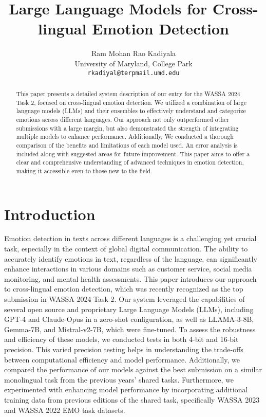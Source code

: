 \documentclass[11pt]{article}
\title{Large Language Models for Cross-lingual Emotion Detection}
\author{Ram Mohan Rao Kadiyala \\
  University of Maryland, College Park \\
  \texttt{rkadiyal@terpmail.umd.edu}}
\begin{document}
\maketitle
\begin{abstract}
This paper presents a detailed system description of our entry for the WASSA 2024 Task 2, focused on cross-lingual emotion detection. We utilized a combination of large language models (LLMs) and their ensembles to effectively understand and categorize emotions across different languages. Our approach not only outperformed other submissions with a large margin, but also demonstrated the strength of integrating multiple models to enhance performance. Additionally, We conducted a thorough comparison of the benefits and limitations of each model used. An error analysis is included along with suggested areas for future improvement. This paper aims to offer a clear and comprehensive understanding of advanced techniques in emotion detection, making it accessible even to those new to the field.
\end{abstract}


\section{Introduction}
Emotion detection in texts across different languages is a challenging yet crucial task, especially in the context of global digital communication. The ability to accurately identify emotions in text, regardless of the language, can significantly enhance interactions in various domains such as customer service, social media monitoring, and mental health assessments. This paper introduces our approach to cross-lingual emotion detection, which was recently recognized as the top submission in WASSA 2024 Task 2\citep{Maladry2024}. Our system leveraged the capabilities of several open source and proprietary Large Language Models (LLMs), including GPT-4\citep{openai2024gpt4} and Claude-Opus\citep{opus2024} in a zero-shot configuration, as well as LLAMA-3-8B\citep{touvron2023llama}, Gemma-7B\citep{gemmateam2024gemma}, and Mistral-v2-7B\citep{jiang2023mistral}, which were fine-tuned. To assess the robustness and efficiency of these models, we conducted tests in both 4-bit and 16-bit precision. This varied precision testing helps in understanding the trade-offs between computational efficiency and model performance. Additionally, we compared the performance of our models against the best submission\citep{patkar-etal-2023-adityapatkar} on a similar monolingual task from the previous years' shared tasks. Furthermore, we experimented with enhancing model performance by incorporating additional training data from previous editions of the shared task, specifically WASSA 2023\citep{barriere-etal-2023-findings} and WASSA 2022\citep{barriere-etal-2022-wassa} EMO task datasets.
\end{document}
